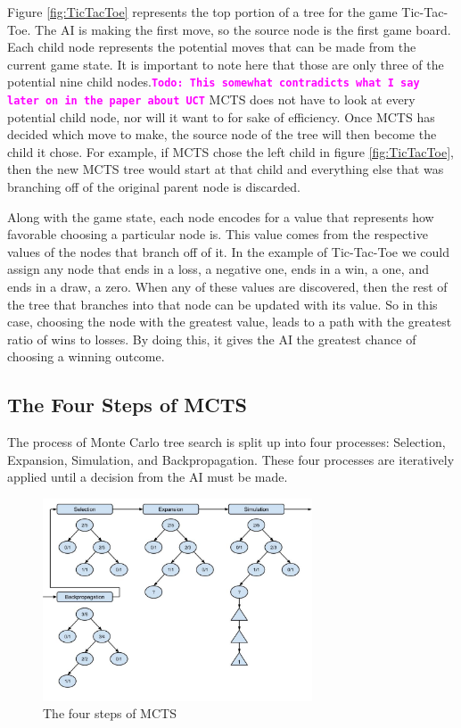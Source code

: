 \documentclass{sig-alternate}
\newcommand{\comment}[1]{{\bf \tt  {#1}}}
\newcommand{\todo}[1]{\textcolor{magenta}{\comment{Todo: {#1}}}}
\begin{document}
Figure \ref{fig:TicTacToe} represents the top portion of a tree for the game Tic-Tac-Toe. The AI is making the first move, so the source node is the first game board. Each child node represents the potential moves that can be made from the current game state. It is important to note here that those are only three of the potential nine child nodes.\todo{This somewhat contradicts what I say later on in the paper about UCT} MCTS does not have to look at every potential child node, nor will it want to for sake of efficiency. Once MCTS has decided which move to make, the source node of the tree will then become the child it chose. For example, if MCTS chose the left child in figure \ref{fig:TicTacToe}, then the new MCTS tree would start at that child and everything else that was branching off of the original parent node is discarded.

Along with the game state, each node encodes for a value that represents how favorable choosing a particular node is. This value comes from the respective values of the nodes that branch off of it. In the example of Tic-Tac-Toe we could assign any node that ends in a loss, a negative one, ends in a win, a one, and ends in a draw, a zero. When any of these values are discovered, then the rest of the tree that branches into that node can be updated with its value. So in this case, choosing the node with the greatest value, leads to a path with the greatest ratio of wins to losses. By doing this, it gives the AI the greatest chance of choosing a winning outcome.

\subsection{The Four Steps of MCTS}
The process of Monte Carlo tree search is split up into four processes: Selection, Expansion, Simulation, and Backpropagation. These four processes are iteratively applied until a decision from the AI must be made.

\begin{figure}[h]
	\includegraphics[width=8cm]{MCTSFourStepProcess.jpg}
	\centering
	\caption{The four steps of MCTS}
	\label{fig:FourSteps}
\end{figure}
\end{document}
